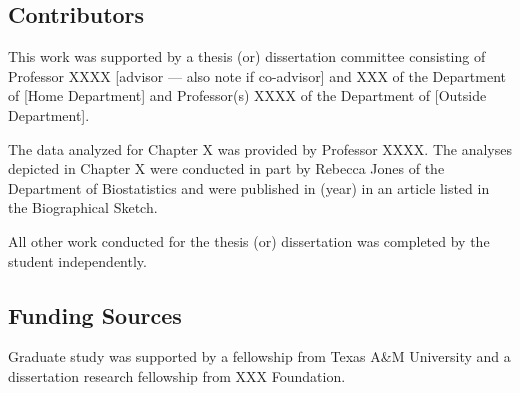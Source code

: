 \subsection*{Contributors}
This work was supported by a thesis (or) dissertation committee consisting of Professor XXXX [advisor --– also note if co-advisor] and XXX of the Department of [Home Department] and Professor(s) XXXX of the Department of [Outside Department].

The data analyzed for Chapter X was provided by Professor XXXX. The analyses depicted in Chapter X were conducted in part by Rebecca Jones of the Department of Biostatistics and were published in (year) in an article listed in the Biographical Sketch.

All other work conducted for the thesis (or) dissertation was completed by the student independently.
\subsection*{Funding Sources}
Graduate study was supported by a fellowship from Texas A\&M University and a dissertation research fellowship from XXX Foundation. 
\pagebreak{}